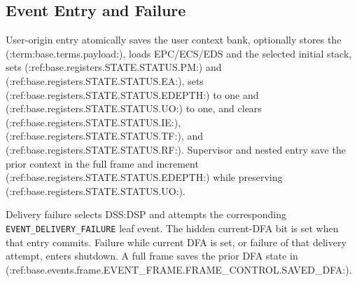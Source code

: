 \subsection{Event Entry and Failure}
User-origin entry atomically saves the user context bank, optionally stores the (:term:base.terms.payload:), loads EPC/ECS/EDS and the selected initial stack, sets (:ref:base.registers.STATE.STATUS.PM:) and (:ref:base.registers.STATE.STATUS.EA:), sets (:ref:base.registers.STATE.STATUS.EDEPTH:) to one and (:ref:base.registers.STATE.STATUS.UO:) to one, and clears (:ref:base.registers.STATE.STATUS.IE:), (:ref:base.registers.STATE.STATUS.TF:), and (:ref:base.registers.STATE.STATUS.RF:). Supervisor and nested entry save the prior context in the full frame and increment (:ref:base.registers.STATE.STATUS.EDEPTH:) while preserving (:ref:base.registers.STATE.STATUS.UO:).

Delivery failure selects DSS:DSP and attempts the corresponding \texttt{EVENT\_DELIVERY\_FAILURE} leaf event. The hidden current-DFA bit is set when that entry commits. Failure while current DFA is set, or failure of that delivery attempt, enters shutdown. A full frame saves the prior DFA state in (:ref:base.events.frame.EVENT_FRAME.FRAME_CONTROL.SAVED_DFA:).
